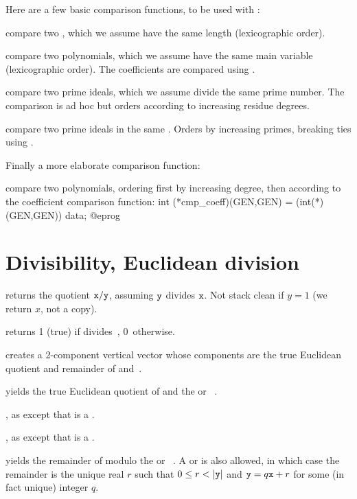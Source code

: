 Here are a few basic comparison functions, to be used with :

 compare two , which we assume have
the same length (lexicographic order).

 compare two polynomials, which we assume
have the same main variable (lexicographic order). The coefficients are
compared using .

 compare two prime ideals, which
we assume divide the same prime number. The comparison is ad hoc but orders
according to increasing residue degrees.

 compare two prime ideals in the same
. Orders by increasing primes, breaking ties using
.

Finally a more elaborate comparison function:

 compare two polynomials,
ordering first by increasing degree, then according to the coefficient
comparison function:
\bprog
  int (*cmp_coeff)(GEN,GEN) = (int(*)(GEN,GEN)) data;
@eprog

\section{Divisibility, Euclidean division}

 returns the quotient ${\tt x} / {\tt y}$,
assuming ${\tt y}$ divides ${\tt x}$. Not stack clean if $y = 1$
(we return $x$, not a copy).

  returns 1 (true) if  divides~,
0~otherwise.

 creates a 2-component vertical
vector whose components are the true Euclidean quotient and remainder
of  and~.

 yields the true Euclidean
quotient of  and the  or ~.

, as 
except that  is a .

, as 
except that  is a .

 yields the remainder of 
modulo the  or ~. A  or  
is also allowed, in which case the remainder is the unique real $r$ such that
$0 \leq r < |{\tt y}|$ and ${\tt y} = q{\tt x} + r$ for some (in fact unique)
integer $q$.

